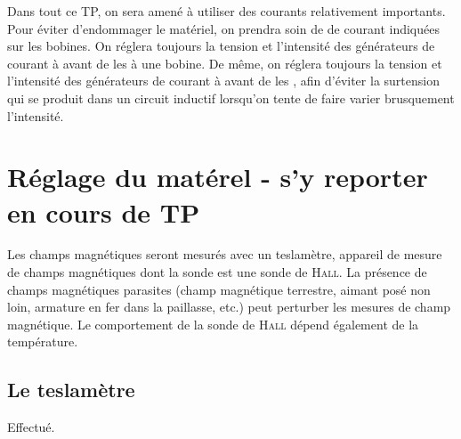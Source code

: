 \documentclass[a4paper,french,bookmarks]{article}
\begin{document}

   
    \begin{warning}{}{}
        Dans tout ce TP, on sera amené à utiliser des courants relativement importants. Pour éviter d'endommager le matériel, on prendra soin de  de courant indiquées sur les bobines. On réglera toujours la tension et l'intensité des générateurs de courant à  avant de les  à une bobine. De même, on réglera toujours la tension et l'intensité des générateurs de courant à  avant de les , afin d'éviter la surtension qui se produit dans un circuit inductif lorsqu'on tente de faire varier brusquement l'intensité.
    \end{warning}
    
    \section{Réglage du matérel - s'y reporter en cours de TP}
    
    Les champs magnétiques seront mesurés avec un teslamètre, appareil de mesure de champs magnétiques dont la sonde est une sonde de \textsc{Hall}. La présence de champs magnétiques parasites (champ magnétique terrestre, aimant posé non loin, armature en fer dans la paillasse, etc.) peut perturber les mesures de champ magnétique. Le comportement de la sonde de \textsc{Hall} dépend également de la température.
    
    \subsection{Le teslamètre}
    
    \noafter
    \nobefore\yesafter
    \begin{expcom}
        Effectué.
    \end{expcom}
    \yesbefore
    
\end{document}
